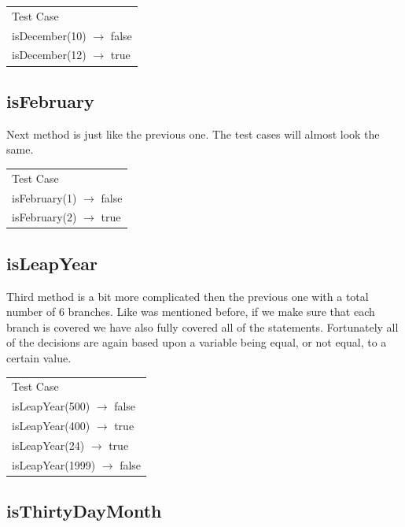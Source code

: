 \documentclass[a4paper]{article}
\begin{document}
\begin{table}[h]
	\begin{tabular}{l}
		Test Case\\
		isDecember(10) $\rightarrow$ false\\
		isDecember(12) $\rightarrow$ true		
	\end{tabular}
\end{table}

\subsection*{isFebruary}

Next method is just like the previous one. The test cases will almost look the same.

\begin{table}[h]
	\begin{tabular}{l}
		Test Case\\
		isFebruary(1) $\rightarrow$ false\\
		isFebruary(2) $\rightarrow$ true		
	\end{tabular}
\end{table}

\subsection*{isLeapYear}

Third method is a bit more complicated then the previous one with a total number of 6 branches. Like was mentioned before, if we make sure that each branch is covered we have also fully covered all of the statements. Fortunately all of the decisions are again based upon a variable being equal, or not equal, to a certain value.

\begin{table}[h]
	\begin{tabular}{l}
		Test Case\\
		isLeapYear(500) $\rightarrow$ false\\
		isLeapYear(400) $\rightarrow$ true\\
		isLeapYear(24) $\rightarrow$ true\\
		isLeapYear(1999) $\rightarrow$ false		
	\end{tabular}
\end{table}

\subsection*{isThirtyDayMonth}
\end{document}
